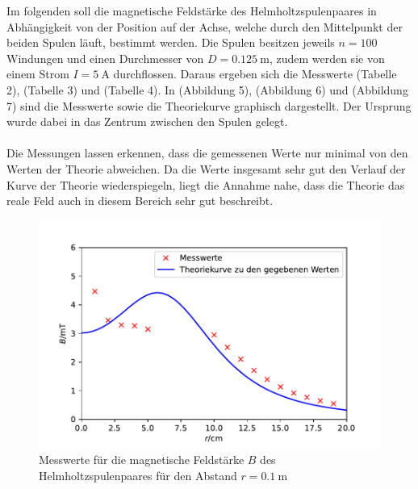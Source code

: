\documentclass[
  bibliography=totoc,     %
  captions=tableheading,  %
  titlepage=firstiscover, %
]{scrartcl}
\begin{document}
  Im folgenden soll die magnetische Feldstärke des Helmholtzspulenpaares in Abhängigkeit
  von der Position auf der Achse, welche durch den Mittelpunkt der beiden Spulen läuft, bestimmt werden.
  Die Spulen besitzen jeweils $n=100$ Windungen und einen Durchmesser von $D=\SI{0,125}{\metre}$, zudem
  werden sie von einem Strom $I=\SI{5}{\ampere}$ durchflossen.
  Daraus ergeben sich die Messwerte (Tabelle 2), (Tabelle 3) und (Tabelle 4).
  In (Abbildung 5), (Abbildung 6) und (Abbildung 7) sind die Messwerte sowie
  die Theoriekurve graphisch dargestellt. Der Ursprung wurde dabei in das Zentrum zwischen den Spulen gelegt.\\\\
  Die Messungen lassen erkennen, dass die gemessenen Werte nur minimal von den Werten der Theorie
  abweichen. Da die Werte insgesamt sehr gut den Verlauf der Kurve der Theorie wiederspiegeln, liegt
  die Annahme nahe, dass die Theorie das reale Feld auch in diesem Bereich sehr gut beschreibt.

  \newpage
  \begin{figure}
    \centering
    \includegraphics{Helmholtz10.pdf}
    \caption{Messwerte für die magnetische 
              Feldstärke $B$ des Helmholtzspulenpaares
              für den Abstand $r=\SI{0.1}{\metre}$}
    \label{fig:helmholtz1}
  \end{figure}

  \FloatBarrier
\end{document}
